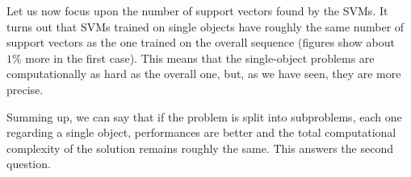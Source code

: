Let us now focus upon the number of support vectors found by the
SVMs. It turns out that SVMs trained on single objects have roughly
the same number of support vectors as the one trained on the overall
sequence (figures show about $1\%$ more in the first case). This means
that the single-object problems are computationally as hard as the
overall one, but, as we have seen, they are more precise.

Summing up, we can say that if the problem is split into subproblems,
each one regarding a single object, performances are better and the
total computational complexity of the solution remains roughly the
same. This answers the second question.
